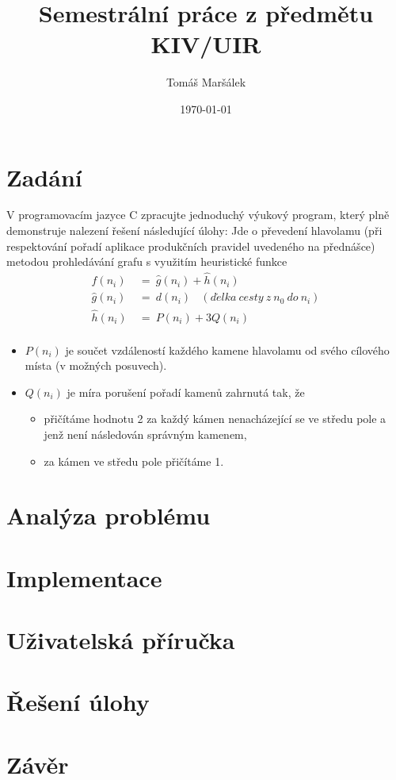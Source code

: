 \documentclass[11pt]{article}
\author{Tomáš Maršálek}
\title{Semestrální práce z předmětu KIV/UIR}
\date{\today}
\begin{document}
\begin{titlepage}
\maketitle
\end{titlepage}

\section{Zadání}
V programovacím jazyce C zpracujte jednoduchý výukový program, který plně
demonstruje nalezení řešení následující úlohy: Jde o převedení hlavolamu 
(při respektování pořadí aplikace produkčních pravidel uvedeného na přednášce)
metodou prohledávání grafu s využitím heuristické funkce
\begin{align*}
\hat{f}(n_i)~&=~\hat{g}(n_i) + \hat{h}(n_i) \\
\hat{g}(n_i)~&=~d(n_i)~~~~(d\acute{e}lka~cesty~z~n_0~do~n_i) \\
\hat{h}(n_i)~&=~P(n_i) + 3 Q(n_i) \\
\end{align*}

\begin{itemize}
	\item $P(n_i)$ je součet vzdáleností každého kamene hlavolamu od svého
          cílového místa (v možných posuvech).
	\item $Q(n_i)$ je míra porušení pořadí kamenů zahrnutá tak, že
	\begin{itemize}
		\item přičítáme hodnotu 2 za každý kámen nenacházející se ve středu
              pole a jenž není následován správným kamenem,
		\item za kámen ve středu pole přičítáme 1.
	\end{itemize}
\end{itemize}

\section{Analýza problému}
\section{Implementace}
\section{Uživatelská příručka}
\section{Řešení úlohy}
\section{Závěr}
\end{document}

